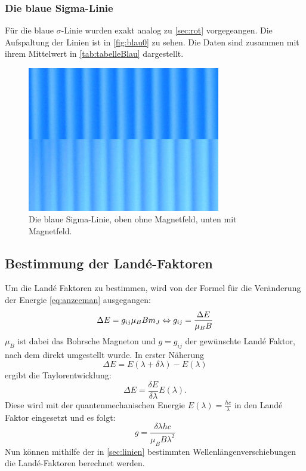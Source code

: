\subsubsection{Die blaue Sigma-Linie}
Für die blaue $\sigma$-Linie wurden exakt analog zu  \autoref{sec:rot} vorgegeangen. Die Aufspaltung
der Linien ist in \autoref{fig:blau0} zu sehen. Die Daten sind zusammen mit ihrem Mittelwert in \autoref{tab:tabelleBlau}
dargestellt.
\begin{figure}
  \centering
  \includegraphics[width=0.75\textwidth]{content/grafiken/blau 90.JPG}
  \caption{Die blaue Sigma-Linie, oben ohne Magnetfeld, unten mit Magnetfeld.}
  \label{fig:blau0}
\end{figure}



\FloatBarrier
\subsection{Bestimmung der Landé-Faktoren}
Um die Landé Faktoren zu bestimmen, wird von der Formel für die Veränderung der
Energie \autoref{eq:anzeeman} ausgegangen:
\begin{equation*}
  \Delta E = g_{ij} \mu_B B m_J\\
  \Leftrightarrow g_{ij}=\frac{\Delta E}{\mu_B B} 
\end{equation*}
$\mu_B$ ist dabei das Bohrsche Magneton und $g=g_{ij}$ der gewünschte Landé Faktor, nach
dem direkt umgestellt wurde. In erster Näherung
\begin{equation*}
  \Delta E=E(\lambda+\delta \lambda) - E(\lambda)
\end{equation*}
ergibt die Taylorentwicklung:
\begin{equation*}
  \Delta E=\frac{\delta E}{\delta \lambda} E(\lambda).
\end{equation*}
Diese wird mit der quantenmechanischen Energie $E(\lambda)=\frac{hc}{\lambda }$
in den Landé Faktor eingesetzt und es folgt:
\begin{equation*}
  g=\frac{\delta \lambda hc}{\mu_B B \lambda^2}
\end{equation*}
Nun können mithilfe der in \autoref{sec:linien} bestimmten Wellenlängenverschiebungen die
Landé-Faktoren berechnet werden.


